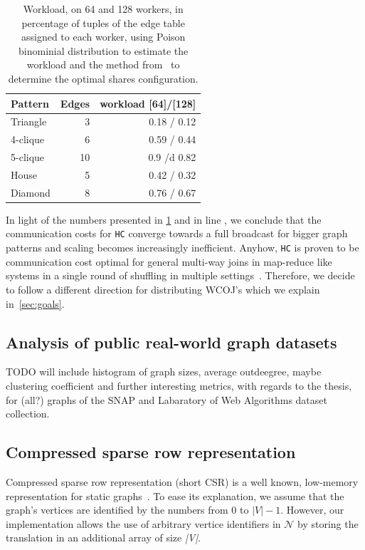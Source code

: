 \begin{table}[t]
    \centering
    \begin{tabular}{lrr}
        \toprule
        Pattern  & Edges  & workload [64]/[128] \\ \midrule
        Triangle & 3                 & 0.18 / 0.12    \\
        4-clique & 6                 & 0.59 / 0.44    \\
        5-clique & 10                & 0.9  /d 0.82    \\
        House    & 5                 & 0.42 / 0.32    \\
        Diamond  & 8                 & 0.76 / 0.67    \\
        \bottomrule
    \end{tabular}
    \caption{Workload, on 64 and 128 workers, in percentage of tuples of the edge table assigned to each worker, using Poison binominial distribution to estimate the workload and the method from~\cite{myria-detailed} to determine the optimal shares configuration.}
    \label{table:workload}
\end{table}

In light of the numbers presented in \cref{table:workload} and in line \cite{ammar2018distributed}, we conclude that the communication costs for \texttt{HC} converge towards a full broadcast for bigger graph patterns and scaling becomes increasingly inefficient.
Anyhow, \texttt{HC} is proven to be communication cost optimal for general multi-way joins in map-reduce like systems in a single round of shuffling in multiple settings~\cite{beame2013,beame2014,beame2016}.
Therefore, we decide to follow a different direction for distributing WCOJ's which we explain in~\cref{sec:goals}.


\subsection{Analysis of public real-world graph datasets}\label{subsec:graph-analysis}
TODO will include histogram of graph sizes, average outdeegree, maybe clustering coefficient and further interesting metrics, with
regards to the thesis, for (all?) graphs of the SNAP and Labaratory of Web Algorithms dataset collection.

\subsection{Compressed sparse row representation}\label{subsec:csr-background}
Compressed sparse row representation (short CSR) is a well known, low-memory representation for static graphs~\cite{csr,csr-first}.
To ease its explanation, we assume that the graph's vertices are identified by the numbers from 0 to $|V| - 1$.
However, our implementation allows the use of arbitrary vertice identifiers in $\mathcal{N}$ by storing the translation in an additional
array of size \textit{|V|}.

